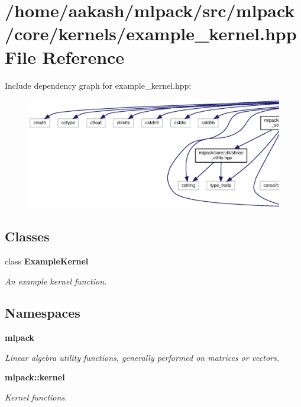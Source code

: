 \section{/home/aakash/mlpack/src/mlpack/core/kernels/example\+\_\+kernel.hpp File Reference}
\label{example__kernel_8hpp}
Include dependency graph for example\+\_\+kernel.\+hpp\+:
\nopagebreak
\begin{figure}[H]
\begin{center}
\leavevmode
\includegraphics[width=350pt]{example__kernel_8hpp__incl}
\end{center}
\end{figure}
\subsection*{Classes}
\begin{DoxyCompactItemize}
\item 
class \textbf{ Example\+Kernel}
\begin{DoxyCompactList}\small\item\em An example kernel function. \end{DoxyCompactList}\end{DoxyCompactItemize}
\subsection*{Namespaces}
\begin{DoxyCompactItemize}
\item 
 \textbf{ mlpack}
\begin{DoxyCompactList}\small\item\em Linear algebra utility functions, generally performed on matrices or vectors. \end{DoxyCompactList}\item 
 \textbf{ mlpack\+::kernel}
\begin{DoxyCompactList}\small\item\em Kernel functions. \end{DoxyCompactList}\end{DoxyCompactItemize}


